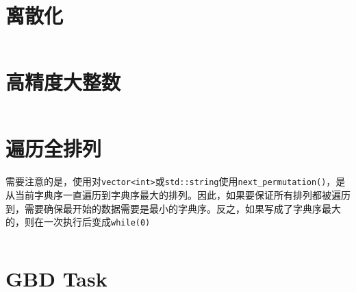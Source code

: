 \documentclass[openany,a4paper]{book}
\begin{document}
\section{离散化}
\inputminted{cpp}{Misc/Discretize.h}

\section{高精度大整数}
\inputminted{cpp}{Misc/BigInt.h}

\section{遍历全排列}
需要注意的是，使用对\verb|vector<int>|或\verb|std::string|使用\verb|next_permutation()|，是从当前字典序一直遍历到字典序最大的排列。因此，如果要保证所有排列都被遍历到，需要确保最开始的数据需要是最小的字典序。反之，如果写成了字典序最大的，则在一次执行后变成\verb|while(0)|
\inputminted{cpp}{Misc/next_permutation.h}

\section{GBD Task}
\inputminted{json}{Misc/GDB-Task.json}
\end{document}
